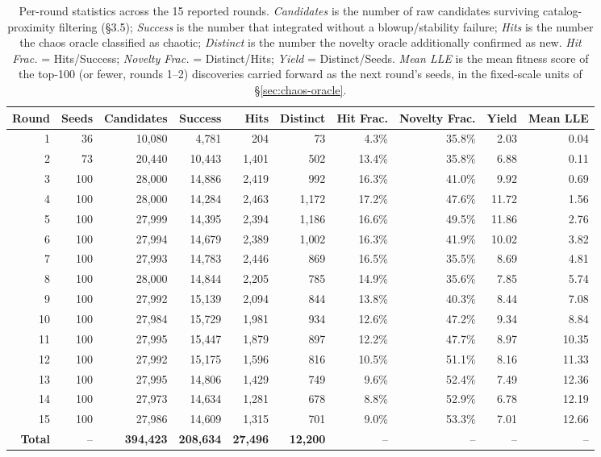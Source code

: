 \documentclass[11pt]{article}
\begin{document}
\begin{table}[htbp]
\centering
\footnotesize
\setlength{\tabcolsep}{4pt}
\caption{Per-round statistics across the 15 reported rounds. \emph{Candidates}
is the number of raw candidates surviving catalog-proximity filtering (\S3.5);
\emph{Success} is the number that integrated without a blowup/stability
failure; \emph{Hits} is the number the chaos oracle classified as chaotic;
\emph{Distinct} is the number the novelty oracle additionally confirmed as
new. \emph{Hit Frac.} = Hits/Success; \emph{Novelty Frac.} = Distinct/Hits;
\emph{Yield} = Distinct/Seeds. \emph{Mean LLE} is the mean fitness score of
the top-100 (or fewer, rounds 1--2) discoveries carried forward as the next
round's seeds, in the fixed-scale units of \S\ref{sec:chaos-oracle}.}
\label{tab:rounds}
\begin{tabular}{rrrrrrrrrr}
\toprule
Round & Seeds & Candidates & Success & Hits & Distinct & Hit Frac. & Novelty Frac. & Yield & Mean LLE \\
\midrule
1  & 36  & 10{,}080 & 4{,}781  & 204   & 73   & 4.3\%  & 35.8\% & 2.03  & 0.04 \\
2  & 73  & 20{,}440 & 10{,}443 & 1{,}401 & 502  & 13.4\% & 35.8\% & 6.88  & 0.11 \\
3  & 100 & 28{,}000 & 14{,}886 & 2{,}419 & 992  & 16.3\% & 41.0\% & 9.92  & 0.69 \\
4  & 100 & 28{,}000 & 14{,}284 & 2{,}463 & 1{,}172 & 17.2\% & 47.6\% & 11.72 & 1.56 \\
5  & 100 & 27{,}999 & 14{,}395 & 2{,}394 & 1{,}186 & 16.6\% & 49.5\% & 11.86 & 2.76 \\
6  & 100 & 27{,}994 & 14{,}679 & 2{,}389 & 1{,}002 & 16.3\% & 41.9\% & 10.02 & 3.82 \\
7  & 100 & 27{,}993 & 14{,}783 & 2{,}446 & 869  & 16.5\% & 35.5\% & 8.69  & 4.81 \\
8  & 100 & 28{,}000 & 14{,}844 & 2{,}205 & 785  & 14.9\% & 35.6\% & 7.85  & 5.74 \\
9  & 100 & 27{,}992 & 15{,}139 & 2{,}094 & 844  & 13.8\% & 40.3\% & 8.44  & 7.08 \\
10 & 100 & 27{,}984 & 15{,}729 & 1{,}981 & 934  & 12.6\% & 47.2\% & 9.34  & 8.84 \\
11 & 100 & 27{,}995 & 15{,}447 & 1{,}879 & 897  & 12.2\% & 47.7\% & 8.97  & 10.35 \\
12 & 100 & 27{,}992 & 15{,}175 & 1{,}596 & 816  & 10.5\% & 51.1\% & 8.16  & 11.33 \\
13 & 100 & 27{,}995 & 14{,}806 & 1{,}429 & 749  & 9.6\%  & 52.4\% & 7.49  & 12.36 \\
14 & 100 & 27{,}973 & 14{,}634 & 1{,}281 & 678  & 8.8\%  & 52.9\% & 6.78  & 12.19 \\
15 & 100 & 27{,}986 & 14{,}609 & 1{,}315 & 701  & 9.0\%  & 53.3\% & 7.01  & 12.66 \\
\midrule
\textbf{Total} & -- & \textbf{394{,}423} & \textbf{208{,}634} & \textbf{27{,}496} & \textbf{12{,}200} & -- & -- & -- & -- \\
\bottomrule
\end{tabular}
\end{table}
\end{document}
